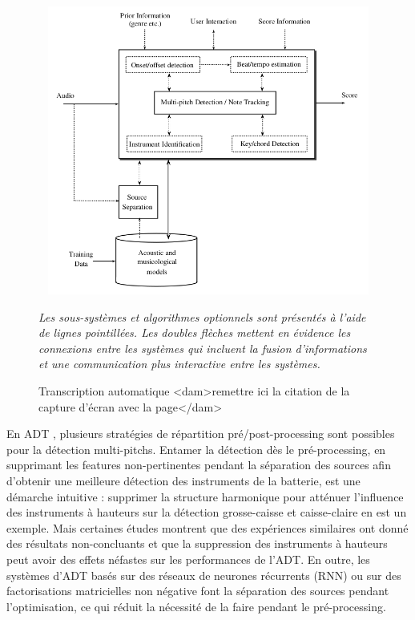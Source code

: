 \begin{figure}[!h]
	\centering
	\includegraphics[height=95mm, width=130mm]{z_images/1_contexte/1_general_process.png}
	\caption{Transcription automatique <dam>remettre ici la citation de la capture d'écran avec la page</dam>}
	\label{AMT_presentation}
	\textit{Les sous-systèmes et algorithmes optionnels sont présentés à l’aide
    de lignes pointillées. Les doubles flèches mettent en évidence les
connexions entre les systèmes qui incluent la fusion d’informations et une
communication plus interactive entre les systèmes.}
\end{figure}%

En ADT \cite{Review_ADT}, plusieurs stratégies de répartition
pré/post-processing sont possibles pour la détection multi-pitchs. Entamer la
détection dès le pré-processing, en supprimant les features non-pertinentes
pendant la séparation des sources afin d’obtenir une meilleure détection des
instruments de la batterie, est une démarche intuitive : supprimer la structure
harmonique pour atténuer l’influence des instruments à hauteurs  sur la détection grosse-caisse et caisse-claire en est un
exemple. 
Mais certaines études montrent que des expériences similaires ont donné des
résultats non-concluants et que la suppression des instruments à hauteurs peut
avoir des effets néfastes sur les performances de l’ADT. En outre, les systèmes
d’ADT basés sur des réseaux de neurones récurrents (RNN) ou sur des
factorisations matricielles non négative font la séparation des sources pendant
l’optimisation, ce qui réduit la nécessité de la faire pendant le
pré-processing.

